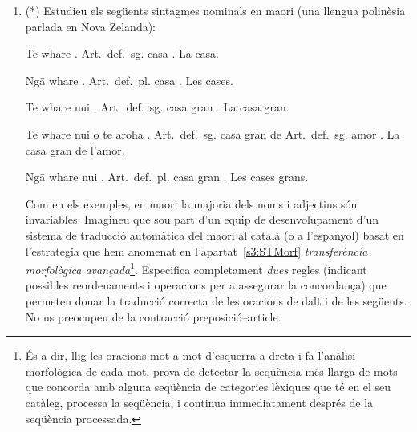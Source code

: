 \begin{enumerate}
\item 
    (*) Estudieu els següents sintagmes nominals en maori (una
     llengua polinèsia parlada en Nova Zelanda):

     \begin{example}
     \gll Te whare .
          \textsf{Art.\ def.\ sg.} casa .
     \glt La casa.
     \glend
     \end{example}

     \begin{example}
     \gll Ng\={a} whare  .
          \textsf{Art.\ def.\ pl.} casa .
     \glt Les cases.
     \glend
     \end{example}

     \begin{example}
     \gll Te whare nui .
          \textsf{Art.\ def.\ sg.} casa gran .
     \glt La casa gran.
     \glend
     \end{example}

     \begin{example}
     \gll Te whare nui o te aroha .
          \textsf{Art.\ def.\ sg.} casa gran de \textsf{Art.\ def.\
          sg.} amor .
     \glt La casa gran de l'amor.
     \glend
     \end{example}

     \begin{example}
     \gll Ng\={a} whare nui . 
          \textsf{Art.\ def.\ pl.} casa gran .
     \glt Les cases grans.
     \glend
     \end{example}
     
     Com en els exemples, en maori la majoria dels noms i adjectius
     són invariables.  Imagineu que sou part d'un equip de
     desenvolupament d'un sistema de traducció automàtica del maori al
     català (o a l'espanyol) basat en l'estrategia que hem anomenat en
     l'apartat~\ref{s3:STMorf} \emph{transferència morfològica avançada}\footnote{És a
       dir, llig les oracions mot a mot d'esquerra a dreta i fa
       l'anàlisi morfològica de cada mot, prova de detectar la
       seqüència més llarga de mots que concorda amb alguna seqüència
       de categories lèxiques que té en el seu catàleg, processa la
       seqüència, i continua immediatament després de la seqüència
       processada.}.  Especifica completament \emph{dues} regles
     (indicant possibles reordenaments i operacions per a assegurar la
     concordança) que permeten donar la traducció correcta de les
     oracions de dalt i de les següents.  No us preocupeu de la
     contracció preposició--article.


\end{enumerate}
